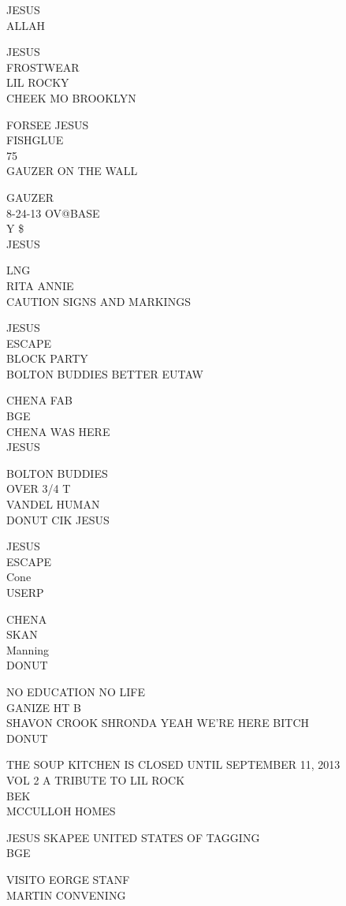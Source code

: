 \documentclass[10pt,letterpaper]{article}
\begin{document}
JESUS\\
ALLAH

JESUS\\
FROSTWEAR\\
LIL ROCKY\\
CHEEK MO BROOKLYN

FORSEE JESUS\\
FISHGLUE\\
75\\
GAUZER ON THE WALL

GAUZER\\
8{-}24{-}13 OV@BASE\\
Y \$\\
JESUS

LNG\\
RITA ANNIE\\
CAUTION SIGNS AND MARKINGS

JESUS\\
ESCAPE\\
BLOCK PARTY\\
BOLTON BUDDIES BETTER EUTAW

CHENA FAB\\
BGE\\
CHENA WAS HERE\\
JESUS

BOLTON BUDDIES\\
OVER 3/4 T\\
VANDEL HUMAN\\
DONUT CIK JESUS

JESUS\\
ESCAPE\\
Cone\\
USERP

CHENA\\
SKAN\\
Manning\\
DONUT

NO EDUCATION NO LIFE\\
GANIZE HT B\\
SHAVON CROOK SHRONDA YEAH WE'RE HERE BITCH\\
DONUT

THE SOUP KITCHEN IS CLOSED UNTIL SEPTEMBER 11, 2013\\
VOL 2 A TRIBUTE TO LIL ROCK\\
BEK\\
MCCULLOH HOMES

JESUS SKAPEE UNITED STATES OF TAGGING\\
BGE

VISITO EORGE STANF\\
MARTIN CONVENING
\end{document}
